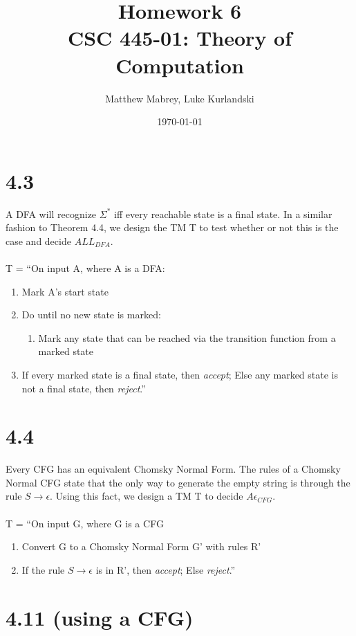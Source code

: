 \documentclass{article}
\title{Homework 6\\[0.2em]\smaller{}CSC 445-01: Theory of Computation}
\author{Matthew Mabrey, Luke Kurlandski}
\date{\today}
\begin{document}
\maketitle

\section*{4.3}

A DFA will recognize $\Sigma^*$ iff every reachable state is a final state. In a similar fashion to Theorem 4.4, we design the TM T to test whether or not this is the case and decide $ALL_{DFA}$.\\\\
T = ``On input A, where A is a DFA:
\begin{enumerate}
    \item Mark A's start state
    \item Do until no new state is marked:
    \begin{enumerate}
        \item Mark any state that can be reached via the transition function from a marked state
    \end{enumerate}
    \item If every marked state is a final state, then \textit{accept}; Else any marked state is not a final state, then \textit{reject}.''
\end{enumerate}

\section*{4.4}

Every CFG has an equivalent Chomsky Normal Form. The rules of a Chomsky Normal CFG state that the only way to generate the empty string is through the rule $S \rightarrow \epsilon$. Using this fact, we design a TM T to decide $A\epsilon_{CFG}$.\\\\
T = ``On input G, where G is a CFG
\begin{enumerate}
    \item Convert G to a Chomsky Normal Form G' with rules R'
    \item If the rule $S\rightarrow \epsilon$ is in R', then \textit{accept}; Else \textit{reject}.''
\end{enumerate}

\section*{4.11 (using a CFG)}
\end{document}
